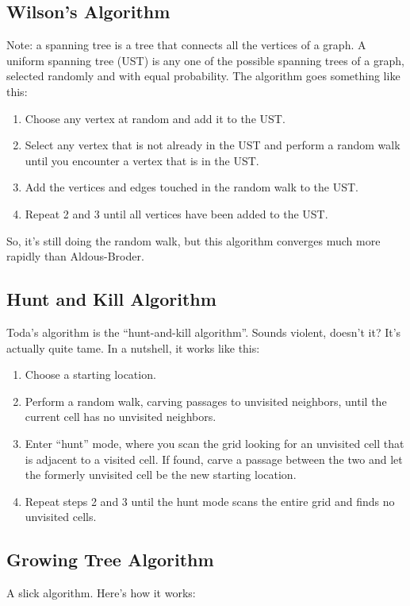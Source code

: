 \documentclass{article}
\begin{document}
\subsection{Wilson's Algorithm}
Note: a spanning tree is a tree that connects all the vertices of a graph. A uniform spanning tree (UST) is any one of the possible spanning trees of a graph, selected randomly and with equal probability.
The algorithm goes something like this:
\begin{enumerate}
    \item Choose any vertex at random and add it to the UST.
    \item Select any vertex that is not already in the UST and perform a random walk until you encounter a vertex that is in the UST.
    \item Add the vertices and edges touched in the random walk to the UST.
    \item Repeat 2 and 3 until all vertices have been added to the UST.
\end{enumerate}

So, it's still doing the random walk, but this algorithm converges much more rapidly than Aldous-Broder.
\subsection{Hunt and Kill Algorithm}
Toda's algorithm is the “hunt-and-kill algorithm”. Sounds violent, doesn't it? It's actually quite tame. In a nutshell, it works like this:

\begin{enumerate}
    \item Choose a starting location.
    \item Perform a random walk, carving passages to unvisited neighbors, until the current cell has no unvisited neighbors.
    \item Enter “hunt” mode, where you scan the grid looking for an unvisited cell that is adjacent to a visited cell. If found, carve a passage between the two and let the formerly unvisited cell be the new starting location.
    \item Repeat steps 2 and 3 until the hunt mode scans the entire grid and finds no unvisited cells.
\end{enumerate}

\subsection{Growing Tree Algorithm}
A slick algorithm. Here's how it works:
\end{document}
